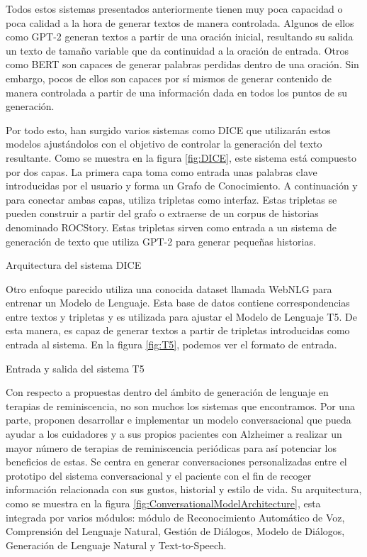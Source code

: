 Todos estos sistemas presentados anteriormente tienen muy poca capacidad o poca calidad a la hora de generar textos de manera controlada. Algunos de ellos como GPT-2 generan textos a partir de una oración inicial, resultando su salida un texto de tamaño variable que da continuidad a la oración de entrada. Otros como BERT son capaces de generar palabras perdidas dentro de una oración. Sin embargo, pocos de ellos son capaces por sí mismos de generar contenido de manera controlada a partir de una información dada en todos los puntos de su generación.

 
Por todo esto, han surgido varios sistemas como DICE \citep{yang2020creative} que utilizarán estos modelos ajustándolos con el objetivo de controlar la generación del texto resultante. Como se muestra en la figura \ref{fig:DICE}, este sistema está compuesto por dos capas. La primera capa toma como entrada unas palabras clave introducidas por el usuario y forma un Grafo de Conocimiento. A continuación y para conectar ambas capas, utiliza tripletas como interfaz. Estas tripletas se pueden construir a partir del grafo o extraerse de un corpus de historias denominado ROCStory. Estas tripletas sirven como entrada a un sistema de generación de texto que utiliza GPT-2 para generar pequeñas historias.

%
{Arquitectura del sistema DICE}

Otro enfoque parecido utiliza una conocida dataset llamada WebNLG para entrenar un Modelo de Lenguaje. Esta base de datos contiene correspondencias entre textos y tripletas y es utilizada para ajustar el Modelo de Lenguaje T5. De esta manera, es capaz de generar textos a partir de tripletas introducidas como entrada al sistema. En la figura \ref{fig:T5}, podemos ver el formato de entrada.

%
{Entrada y salida del sistema T5}

Con respecto a propuestas dentro del ámbito de generación de lenguaje en terapias de reminiscencia, no son muchos los sistemas que encontramos. Por una parte, \citep{deconversational} proponen desarrollar e implementar un modelo conversacional que pueda ayudar a los cuidadores y a sus propios pacientes con Alzheimer a realizar un mayor número de terapias de reminiscencia periódicas para así potenciar los beneficios de estas. Se centra en generar conversaciones personalizadas entre el prototipo del sistema conversacional y el paciente con el fin de recoger información relacionada con sus gustos, historial y estilo de vida. Su arquitectura, como se muestra en la figura \ref{fig:ConversationalModelArchitecture}, esta integrada por varios módulos: módulo de Reconocimiento Automático de Voz, Comprensión del Lenguaje Natural, Gestión de Diálogos, Modelo de Diálogos, Generación de Lenguaje Natural y Text-to-Speech.



